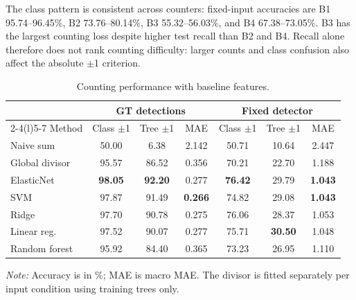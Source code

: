 \documentclass[conference,a4paper]{IEEEtran}
\begin{document}
The class pattern is consistent across counters: fixed-input accuracies are
B1 95.74--96.45\%, B2 73.76--80.14\%, B3 55.32--56.03\%, and B4
67.38--73.05\%. B3 has the largest counting loss despite higher test recall
than B2 and B4. Recall alone therefore does not rank counting difficulty:
larger counts and class confusion also affect the absolute $\pm$1 criterion.

\begin{table}[!tb]
  \centering
  \footnotesize
  \renewcommand{\arraystretch}{1.13}
  \setlength{\tabcolsep}{3pt}
  \caption{Counting performance with baseline features.}
  \label{tab:counting}
  \begin{tabular*}{\columnwidth}{@{\extracolsep{\fill}}lcccccc@{}}
    \toprule
     & \multicolumn{3}{c}{GT detections} & \multicolumn{3}{c}{Fixed detector} \\
    \cmidrule(lr){2-4}\cmidrule(l){5-7}
    Method & Class $\pm$1 & Tree $\pm$1 & MAE & Class $\pm$1 & Tree $\pm$1 & MAE \\
    \midrule
    Naive sum         & 50.00          & 6.38           & 2.142          & 50.71          & 10.64          & 2.447 \\
    Global divisor    & 95.57          & 86.52          & 0.356          & 70.21          & 22.70          & 1.188 \\
    \addlinespace[2pt]
    ElasticNet        & \textbf{98.05} & \textbf{92.20} & 0.277          & \textbf{76.42} & 29.79          & \textbf{1.043} \\
    SVM               & 97.87          & 91.49          & \textbf{0.266} & 74.82          & 29.08          & \textbf{1.043} \\
    Ridge             & 97.70          & 90.78          & 0.275          & 76.06          & 28.37          & 1.053 \\
    Linear reg. & 97.52          & 90.07          & 0.277          & 75.71          & \textbf{30.50} & 1.048 \\
    Random forest     & 95.92          & 84.40          & 0.365          & 73.23          & 26.95          & 1.110 \\
    \bottomrule
  \end{tabular*}
\par\vspace{3pt}
  \begin{minipage}{\columnwidth}
    \footnotesize\raggedright
    \textit{Note:} Accuracy is in \%; MAE is macro MAE. The divisor is fitted separately per input condition using training trees only.
  \end{minipage}
\end{table}
\end{document}
